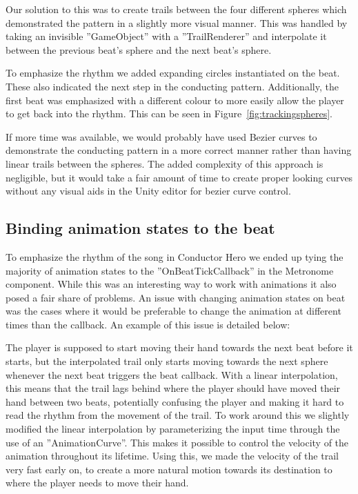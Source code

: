 Our solution to this was to create trails between the four different spheres which demonstrated the pattern in a slightly more visual manner. 
This was handled by taking an invisible ''GameObject'' with a ''TrailRenderer'' and interpolate it between the previous beat's sphere and the next beat’s sphere.

To emphasize the rhythm we added expanding circles instantiated on the beat. These also indicated the next step in the conducting pattern. Additionally, the first beat was emphasized with a different colour to more easily allow the player to get back into the rhythm. This can be seen in Figure~\ref{fig:trackingspheres}. 

If more time was available, we would probably have used Bezier curves to demonstrate the conducting pattern in a more correct manner rather than having linear trails between the spheres. The added complexity of this approach is negligible, but it would take a fair amount of time to create proper looking curves without any visual aids in the Unity editor for bezier curve control. 


\subsection{Binding animation states to the beat}
To emphasize the rhythm of the song in Conductor Hero we ended up tying the majority of animation states to the ''OnBeatTickCallback'' in the Metronome component. While this was an interesting way to work with animations it also posed a fair share of problems. An issue with changing animation states on beat was the cases where it would be preferable to change the animation at different times than the callback. An example of this issue is detailed below: 

The player is supposed to start moving their hand towards the next beat before it starts, but the interpolated trail only starts moving towards the next sphere whenever the next beat triggers the beat callback. With a linear interpolation, this means that the trail lags behind where the player should have moved their hand between two beats, potentially confusing the player and making it hard to read the rhythm from the movement of the trail. To work around this we slightly modified the linear interpolation by parameterizing the input time through the use of an ''AnimationCurve''. This makes it possible to control the velocity of the animation throughout its lifetime. Using this, we made the velocity of the trail very fast early on, to create a more natural motion towards its destination to where the player needs to move their hand. 


